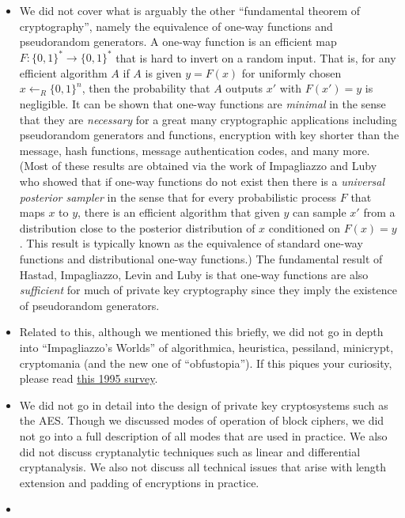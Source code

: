 \begin{itemize}
\item
  We did not cover what is arguably the other ``fundamental theorem of
  cryptography'', namely the equivalence of one-way functions and
  pseudorandom generators. A one-way function is an efficient map
  \(F:\{0,1\}^*\rightarrow\{0,1\}^*\) that is hard to invert on a random
  input. That is, for any efficient algorithm \(A\) if \(A\) is given
  \(y=F(x)\) for uniformly chosen \(x\leftarrow_R\{0,1\}^n\), then the
  probability that \(A\) outputs \(x'\) with \(F(x')=y\) is negligible.
  It can be shown that one-way functions are \emph{minimal} in the sense
  that they are \emph{necessary} for a great many cryptographic
  applications including pseudorandom generators and functions,
  encryption with key shorter than the message, hash functions, message
  authentication codes, and many more. (Most of these results are
  obtained via the work of Impagliazzo and Luby who showed that if
  one-way functions do not exist then there is a \emph{universal
  posterior sampler} in the sense that for every probabilistic process
  \(F\) that maps \(x\) to \(y\), there is an efficient algorithm that
  given \(y\) can sample \(x'\) from a distribution close to the
  posterior distribution of \(x\) conditioned on \(F(x)=y\). This result
  is typically known as the equivalence of standard one-way functions
  and distributional one-way functions.) The fundamental result of
  Hastad, Impagliazzo, Levin and Luby is that one-way functions are also
  \emph{sufficient} for much of private key cryptography since they
  imply the existence of pseudorandom generators.
\item
  Related to this, although we mentioned this briefly, we did not go in
  depth into ``Impagliazzo's Worlds'' of algorithmica, heuristica,
  pessiland, minicrypt, cryptomania (and the new one of ``obfustopia'').
  If this piques your curiosity, please read
  \href{http://www.cs.mun.ca/~kol/courses/6743-w15/papers/russell-fiveworlds.pdf}{this
  1995 survey}.
\item
  We did not go in detail into the design of private key cryptosystems
  such as the AES. Though we discussed modes of operation of block
  ciphers, we did not go into a full description of all modes that are
  used in practice. We also did not discuss cryptanalytic techniques
  such as linear and differential cryptanalysis. We also not discuss all
  technical issues that arise with length extension and padding of
  encryptions in practice.
\item

\end{itemize}
